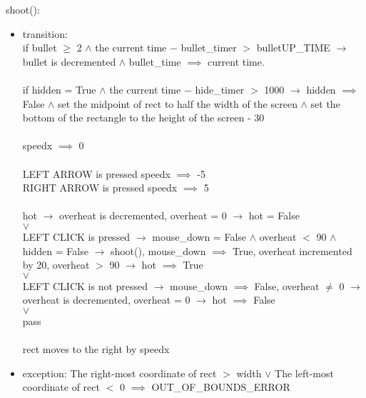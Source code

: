 \documentclass[12pt, titlepage]{article}
\begin{document}
\noindent shoot(): 
\begin{itemize}
\item transition: \\
if bullet $\geq$ 2 $\wedge$ the current time $-$ bullet\_timer $>$ bulletUP\_TIME $\longrightarrow$ bullet is decremented $\wedge$ bullet\_time $\implies$ current time.\\\\
if hidden = True $\wedge$ the current time $-$ hide\_timer $>$ 1000 $\longrightarrow$ hidden $\implies$ False $\wedge$ set the midpoint of rect to half the width of the screen $\wedge$ set the bottom of the rectangle to the height of the screen - 30\\\\
speedx $\implies$ 0\\\\
LEFT ARROW is pressed speedx $\implies$ -5\\
RIGHT ARROW is pressed speedx $\implies$ 5\\\\
hot $\longrightarrow$ overheat is decremented, overheat = 0 $\longrightarrow$ hot = False\\
$\vee$\\
LEFT CLICK is pressed $\longrightarrow$ mouse\_down = False $\wedge$ overheat $<$ 90 $\wedge$ hidden = False $\longrightarrow$ shoot(), mouse\_down $\implies$ True, overheat incremented by 20, overheat $>$ 90 $\longrightarrow$ hot $\implies$ True\\
$\vee$\\
LEFT CLICK is not pressed $\longrightarrow$ mouse\_down $\implies$ False, overheat $\neq$ 0 $\longrightarrow$ overheat is decremented, overheat = 0 $\longrightarrow$ hot $\implies$ False\\
$\vee$\\
pass\\\\
rect moves to the right by speedx

\item exception: The right-most coordinate of rect $>$ width $\vee$ The left-most coordinate of rect $<$ 0 $\implies$ OUT\_OF\_BOUNDS\_ERROR
\end{itemize}
\end{document}
